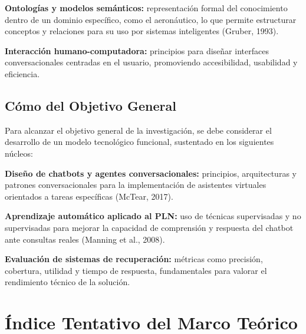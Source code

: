 \textbf{Ontologías y modelos semánticos:} representación formal del conocimiento dentro de un dominio específico, como el aeronáutico, lo que permite estructurar conceptos y relaciones para su uso por sistemas inteligentes (Gruber, 1993).
  
\textbf{Interacción humano-computadora:} principios para diseñar interfaces conversacionales centradas en el usuario, promoviendo accesibilidad, usabilidad y eficiencia.


\subsection{Cómo del Objetivo General}
Para alcanzar el objetivo general de la investigación, se debe considerar el desarrollo de un modelo tecnológico funcional, sustentado en los siguientes núcleos:


\textbf{Diseño de chatbots y agentes conversacionales:} principios, arquitecturas y patrones conversacionales para la implementación de asistentes virtuales orientados a tareas específicas (McTear, 2017).
  
\textbf{Aprendizaje automático aplicado al PLN:} uso de técnicas supervisadas y no supervisadas para mejorar la capacidad de comprensión y respuesta del chatbot ante consultas reales (Manning et al., 2008).
  
\textbf{Evaluación de sistemas de recuperación:} métricas como precisión, cobertura, utilidad y tiempo de respuesta, fundamentales para valorar el rendimiento técnico de la solución.


\section{Índice Tentativo del Marco Teórico}


